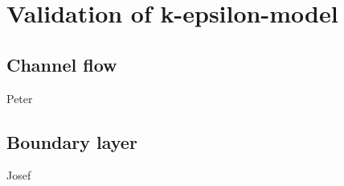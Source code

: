 \chapter{Validation of k-epsilon-model} %
\label{cha:validation_of_k_epsilon_model}

\section{Channel flow} %
\label{sec:channel_flow}

Peter


\section{Boundary layer} %
\label{sec:boundary_layer}

Josef


